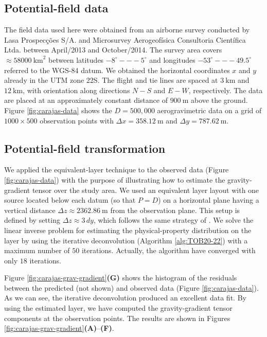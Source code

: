 \subsection{Potential-field data}

The field data used here were obtained from an airborne survey conducted by Lasa Prospec{\c c}{\~o}es S/A. 
and Microsurvey Aerogeof{\'i}sica Consultoria Cient{\'i}fica Ltda. between April/2013 and October/2014.
The survey area covers $\approx 58000 \: \mathrm{km}^2$ between latitudes $-8^{\circ} -- -5^{\circ}$
and longitudes $-53^{\circ} -- -49.5^{\circ}$ referred to the WGS-84 datum.
We obtained the horizontal coordinates $x$ and $y$ already in the UTM zone 22S. 
The flight and tie lines are spaced at $3 \: \mathrm{km}$  and $12 \: \mathrm{km}$, with orientation along 
directions $N-S$ and $E-W$, respectively.
The data are placed at an approximately constant distance of $900 \: \mathrm{m}$ above the ground.
Figure \ref{fig:carajas-data} shows the $D = 500,000$ aerogravimetric data on a grid of 
$1000 \times 500$ observation points with $\Delta x = 358.12 \: \mathrm{m}$ and $\Delta y = 787.62 \: \mathrm{m}$. 

\subsection{Potential-field transformation}

We applied the equivalent-layer technique to the observed data (Figure \ref{fig:carajas-data}) with the
purpose of illustrating how to estimate the gravity-gradient tensor over the study area.
We used an equivalent layer layout with one source located below each datum
(so that $P=D$) on a horizontal plane having a vertical distance $\Delta z \approx 2362.86 \: \mathrm{m}$ from the observation plane.
This setup is defined by setting $\Delta z \approx 3 \, dy$, which follows the same strategy of \citet{reis-etal2020}.
We solve the linear inverse problem for estimating the physical-property distribution on the layer by
using the iterative deconvolution (Algorithm \ref{alg:TOB20-22}) with a maximum number of $50$ iterations. 
Actually, the algorithm have converged with only $18$ iterations.

Figure \ref{fig:carajas-grav-gradient}\textbf{(G)} shows the histogram of the residuals between the predicted 
(not shown) and observed data (Figure \ref{fig:carajas-data}).
As we can see, the iterative deconvolution produced an excellent data fit.
By using the estimated layer, we have computed the gravity-gradient tensor components at the observation points.
The results are shown in Figures \ref{fig:carajas-grav-gradient}\textbf{(A)}--\textbf{(F)}.

